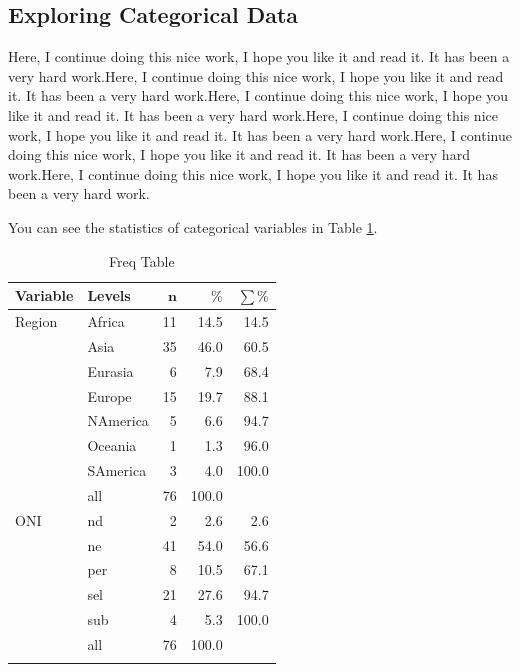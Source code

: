 \documentclass[11pt]{article}
\begin{document}




\subsection{Exploring Categorical Data}\label{catexplo}

Here, I continue doing this nice work, I hope you like it and read it. It has been a very hard work.Here, I continue doing this nice work, I hope you like it and read it. It has been a very hard work.Here, I continue doing this nice work, I hope you like it and read it. It has been a very hard work.Here, I continue doing this nice work, I hope you like it and read it. It has been a very hard work.Here, I continue doing this nice work, I hope you like it and read it. It has been a very hard work.Here, I continue doing this nice work, I hope you like it and read it. It has been a very hard work.

You can see the statistics of categorical variables in Table \ref{catexplore_table}.


\begingroup\normalsize
\begin{longtable}{llrrr}
\caption{Freq Table} \\ 
 \textbf{Variable} & \textbf{Levels} & $\mathbf{n}$ & $\mathbf{\%}$ & $\mathbf{\sum \%}$ \\ 
  \hline
Region & Africa & 11 & 14.5 & 14.5 \\ 
   & Asia & 35 & 46.0 & 60.5 \\ 
   & Eurasia & 6 & 7.9 & 68.4 \\ 
   & Europe & 15 & 19.7 & 88.1 \\ 
   & NAmerica & 5 & 6.6 & 94.7 \\ 
   & Oceania & 1 & 1.3 & 96.0 \\ 
   & SAmerica & 3 & 4.0 & 100.0 \\ 
   \hline
 & all & 76 & 100.0 &  \\ 
   \hline
\hline
ONI & nd & 2 & 2.6 & 2.6 \\ 
   & ne & 41 & 54.0 & 56.6 \\ 
   & per & 8 & 10.5 & 67.1 \\ 
   & sel & 21 & 27.6 & 94.7 \\ 
   & sub & 4 & 5.3 & 100.0 \\ 
   \hline
 & all & 76 & 100.0 &  \\ 
   \hline
\hline
\hline
\label{catexplore_table}
\end{longtable}
\endgroup
\end{document}
